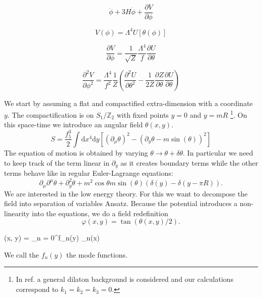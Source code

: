 \documentclass[master,       %
               twoside,        %
               BCOR10mm,       %
               english,ngerman, %
               ]{GAUBM}
\begin{document}
\begin{otherlanguage}{english}
\begin{equation}
	\ddot{\phi} + 3 H \dot{\phi} + \frac{\partial V}{\partial \phi}
\end{equation}

\begin{equation}
	V(\phi) = \Lambda^4 U[\theta(\phi)]
\end{equation}

\begin{equation}
	\frac{\partial V}{\partial \phi} = \frac{1}{\sqrt{Z}} \frac{\Lambda^4}{f} \frac{\partial U}{\partial \theta}
\end{equation}

\begin{equation}
	\frac{\partial^2 V}{\partial \phi^2} = \frac{\Lambda^4}{f^2} \frac{1}{Z} \left( \frac{\partial^2 U}{\partial \theta^2} - \frac{1}{2 Z} \frac{\partial Z}{\partial \theta} \frac{\partial U}{\partial \theta} \right)
\end{equation}



We start by assuming a flat and compactified extra-dimension with a coordinate $y$. The compactification is on $S_1 / \mathbb{Z}_2$ with fixed points $y = 0$ and $y = mR$ \footnote{In ref. \cite{general_cont_clockwork_Choi_2018} a general dilaton background is considered and our calculations correspond to $k_1 = k_2 = k_3 = 0$.}.
On this space-time we introduce an angular field $\theta(x, y)$.
\begin{equation}
	S = \frac{f_5^3}{2} \int \mathrm{d} x^4 \mathrm{d} y \left[ (\partial_\mu \theta)^2 - (\partial_y \theta - m \sin(\theta))^2 \right]
\end{equation}
The equation of motion is obtained by varying $\theta \to \theta + \delta \theta$. In particular we need to keep track of the term linear in $\partial_y$ as it
creates boundary terms while the other terms behave like in regular Euler-Lagrange equations:
\begin{equation}
	\partial_\mu \partial^\mu \theta + \partial_y^2 \theta + m^2 \cos \theta m \sin(\theta) (\delta(y) - \delta(y - \pi R)).
\end{equation}
We are interested in the low energy theory. For this we want to decompose the field into separation of variables Ansatz. Because the potential introduces a non-linearity into the equations, we do a field redefinition 
\begin{equation}
	\varphi(x, y) = \tan(\theta(x, y) / 2).
\end{equation}
\begin{ equation}
	\theta(x, y) = \sum_{n = 0}^\infty f_n(y) \chi_n(x)
\end{ equation}
We call the $f_n(y)$ the mode functions. 


\end{otherlanguage}
\end{document}
